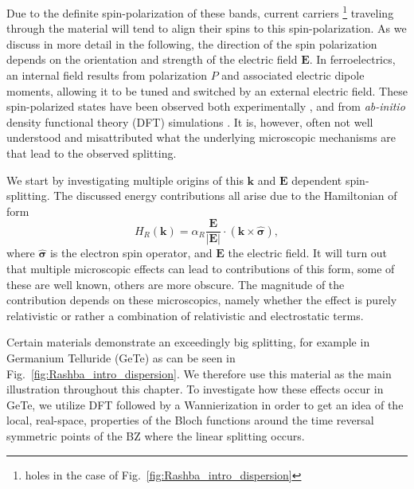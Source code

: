 Due to the definite spin-polarization of these bands, current carriers \footnote{holes in the case of Fig.~\ref{fig:Rashba_intro_dispersion}} traveling through the material will tend to align their spins to this spin-polarization.
As we discuss in more detail in the following, the direction of the spin polarization depends on the orientation and strength of the electric field $\bm{E}$.
In ferroelectrics, an internal field results from polarization $P$ and associated electric dipole moments, allowing it to be tuned and switched by an external electric field.
These spin-polarized states have been observed both experimentally \cite{Ishizaka2011,Liebmann2016,Krempasky2015SurfaceSemiconductor}, and from {\it ab-initio} density functional theory (DFT) simulations \cite{DiSante2013}.
It is, however, often not well understood and misattributed what the underlying microscopic mechanisms are that lead to the observed splitting.

We start by investigating multiple origins of this $\bm{k}$ and $\bm{E}$ dependent spin-splitting. The discussed energy contributions all arise due to the Hamiltonian of form
\begin{equation}
	\label{eq:Rashba_form}
	H_R(\bm{k}) = \alpha_R \frac{\bm{E}}{|\bm{E}|} \cdot (\bm{k} \times \hat{\bm{\sigma}}),
\end{equation}
where $\hat{\bm{\sigma}}$ is the electron spin operator, and $\bm{E}$ the electric field.
It will turn out that multiple microscopic effects can lead to contributions of this form, some of these are well known, others are more obscure.
The magnitude of the contribution depends on these microscopics, namely whether the effect is purely relativistic or rather a combination of relativistic and electrostatic terms.

Certain materials demonstrate an exceedingly big splitting, for example in Germanium Telluride (GeTe) as can be seen in Fig.~\ref{fig:Rashba_intro_dispersion}.
We therefore use this material as the main illustration throughout this chapter.
To investigate how these effects occur in GeTe, we utilize DFT followed by a Wannierization in order to get an idea of the local, real-space, properties of the Bloch functions around the time reversal symmetric points of the BZ where the linear splitting occurs.

